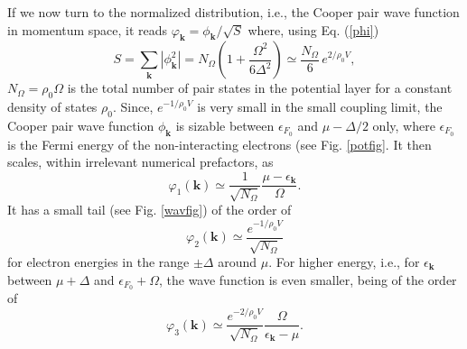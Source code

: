 \documentclass[twocolumn,showpacs]{revtex4}
\def\v#1{\mathbf{#1}}
\begin{document}
If we now turn to the normalized distribution, i.e., the Cooper pair wave function in momentum space, it reads $\varphi_{\v k}=\phi_{\v k}/\sqrt{S}$ where, using Eq. (\ref{phi})
\begin{equation}
S=\sum_{\v k}|\phi_{\v k}^2|=N_{\Omega}(1+\frac{\Omega^2}{6\Delta^2})\simeq \frac{N_{\Omega}}{6}\,e^{2/\rho_0V},
\end{equation}
 $N_{\Omega}=\rho_0\Omega$ is the total number of pair states in the potential layer for a constant density of states $\rho_0$. Since,  $e^{-1/\rho_0V}$ is very small in the small coupling limit, the Cooper pair wave function $\phi_{\v{k}}$ is sizable between $\epsilon_{F_0}$ and $\mu-\Delta/2$ only, where $\epsilon_{F_0}$  is the Fermi energy of the non-interacting electrons (see Fig. \ref{potfig}. It then  scales, within irrelevant numerical prefactors,  as 
\begin{equation}
\varphi_1(\v k)\simeq \frac{1}{\sqrt{N_{\Omega}}}\frac{\mu-\epsilon_{\v k}}{\Omega}.
\end{equation}
It has a small tail (see Fig. \ref{wavfig}) of the order of
\begin{equation}
\varphi_2(\v k)\simeq \frac{e^{-1/\rho_0V}}{\sqrt{N_{\Omega}}}
\end{equation}
for electron energies in the range $\pm \Delta$ around $\mu$. For higher energy, i.e., for $\epsilon_{\v k}$ between $\mu+\Delta$ and $\epsilon_{F_0}+\Omega$, the wave function is even smaller, being of the order of 
\begin{equation}
\varphi_3(\v k)\simeq \frac{e^{-2/\rho_0V}}{\sqrt{N_{\Omega}}}\frac{\Omega}{\epsilon_{\v k}-\mu}.
\end{equation}
\end{document}
